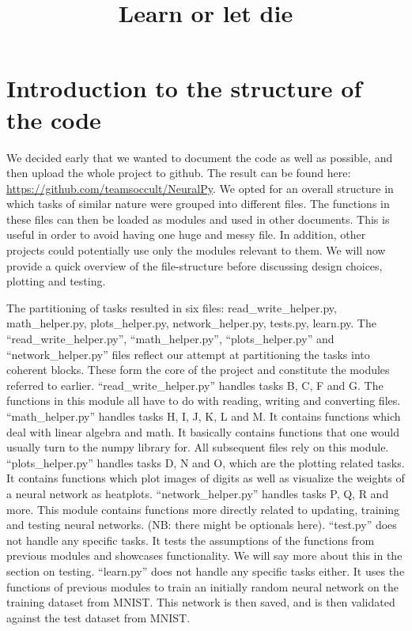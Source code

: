 \documentclass[letterpaper, 12 pt, conference]{ieeeconf}
\title{\LARGE \bf
Learn or let die 
}
\begin{document}
\maketitle

\section{Introduction to the structure of the code}

We decided early that we wanted to document the code as well as possible, and then upload the whole project to github. The result can be found here: \url{https://github.com/teamsoccult/NeuralPy}.
We opted for an overall structure in which tasks of similar nature were grouped into different files. The functions in these files can then be loaded as modules and used in other documents. This is useful in order to avoid having one huge and messy file. In addition, other projects could potentially use only the modules relevant to them. We will now provide a quick overview of the file-structure before discussing design choices, plotting and testing.

The partitioning of tasks resulted in six files: 
read\_write\_helper.py, math\_helper.py, plots\_helper.py, network\_helper.py, tests.py, learn.py. 
The “read\_write\_helper.py”, “math\_helper.py”, “plots\_helper.py” and “network\_helper.py” files reflect our attempt at partitioning the tasks into coherent blocks. These form the core of the project and constitute the modules referred to earlier. 
“read\_write\_helper.py” handles tasks B, C, F and G. The functions in this module all have to do with reading, writing and converting files. 
“math\_helper.py” handles tasks H, I, J, K, L and M. It contains functions which deal with linear algebra and math. It basically contains functions that one would usually turn to the numpy library for. All subsequent files rely on this module.  
“plots\_helper.py” handles tasks D, N and O, which are the plotting related tasks. It contains functions which plot images of digits as well as visualize the weights of a neural network as heatplots. 
“network\_helper.py” handles tasks P, Q, R and more. This module contains functions more directly related to updating, training and testing neural networks. (NB: there might be optionals here). 
“test.py” does not handle any specific tasks. It tests the assumptions of the functions from previous modules and showcases functionality. We will say more about this in the section on testing. 
“learn.py” does not handle any specific tasks either. It uses the functions of previous modules to train an initially random neural network on the training dataset from MNIST. This network is then saved, and is then validated against the test dataset from MNIST.
\end{document}
